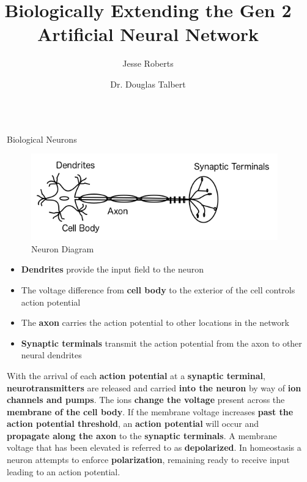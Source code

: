 \documentclass[final]{beamer}
\title{Biologically Extending the Gen 2 Artificial Neural Network}
\author{Jesse Roberts \inst{1} \and Dr. Douglas Talbert \inst{2}}
\institute[shortinst]{\inst{1} Vanderbilt University \samelineand \inst{2} Tennessee Technological University}
\newlength{\sepwidth}
\newlength{\colwidth}
\newcommand{\separatorcolumn}{\begin{column}{\sepwidth}\end{column}}
\begin{document}
\begin{frame}[t]
\begin{columns}[t]
\separatorcolumn

\begin{column}{\colwidth}

  \begin{block}{Biological Neurons}

    \begin{figure}
      \centering
      \includegraphics[width=20.0cm]{Neuron.png}
      \caption{Neuron Diagram}
    \end{figure}

    \begin{itemize}
      \item \textbf{Dendrites} provide the input field to the neuron
      \item The voltage difference from \textbf{cell body} to the exterior of the cell controls action potential
      \item The \textbf{axon} carries the action potential to other locations in the network
      \item \textbf{Synaptic terminals} transmit the action potential from the axon to other neural dendrites

    \end{itemize}

    With the arrival of each \textbf{action potential} at a \textbf{synaptic terminal}, \textbf{neurotransmitters} are released and carried \textbf{into the neuron} by way of \textbf{ion channels and pumps}. The ions \textbf{change the voltage} present across the \textbf{membrane of the cell body}. If the membrane voltage increases \textbf{past the action potential threshold}, an \textbf{action potential} will occur and \textbf{propagate along the axon} to the \textbf{synaptic terminals}. A membrane voltage that has been elevated is referred to as \textbf{depolarized}. In homeostasis a neuron attempts to enforce \textbf{polarization}, remaining ready to receive input leading to an action potential. 


\end{block}
\end{column}
\end{columns}
\end{frame}
\end{document}

